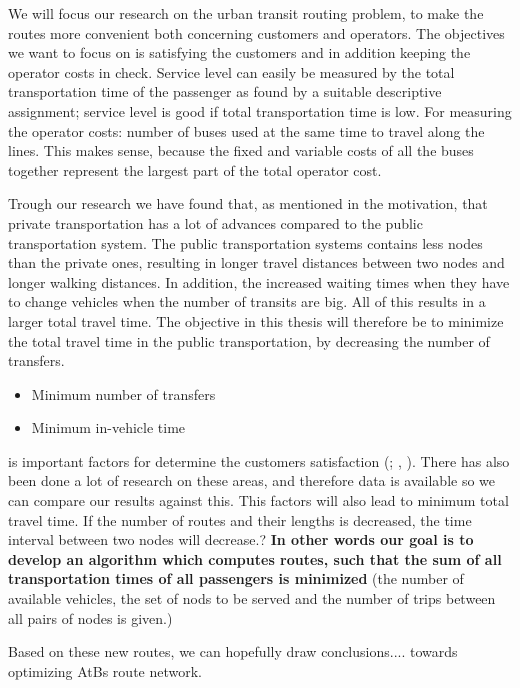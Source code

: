 We will focus our research on the urban transit routing problem, to make the routes more convenient both concerning customers and operators. The objectives we want to focus on is satisfying the customers and in addition keeping the operator costs in check. Service level can easily be measured by the total transportation time of the passenger as found by a suitable descriptive assignment; service level is good if total transportation time is low. For measuring the operator costs: number of buses used at the same time to travel along the lines. This makes sense, because the fixed and variable costs of all the buses together represent the largest part of the total operator cost. %

Trough our research we have found that, as mentioned in the motivation, that private transportation has a lot of advances compared to the public transportation system. The public transportation systems contains less nodes than the private ones, resulting in longer travel distances between two nodes and longer walking distances. In addition, the increased waiting times when they have to change vehicles when the number of transits are big. All of this results in a larger total travel time. The objective in this thesis will therefore be to minimize the total travel time in the public transportation, by decreasing the number of transfers. \citep{mandl79} 
\begin{itemize}
\item Minimum number of transfers
\item Minimum in-vehicle time
\end{itemize}
is important factors for determine the customers satisfaction ({\citet{kechagiopoulos14}; \citet{dias14}, \citet{yang07} }). There has also been done a lot of research on these areas, and therefore data is available so we can compare our results against this. This factors will also lead to minimum total travel time. 
If the number of routes and their lengths is decreased, the time interval between two nodes will decrease.?
\textbf{In other words our goal is to develop an algorithm which computes routes, such that the sum of all transportation times of all passengers is minimized}  (the number of available vehicles, the set of nods to be served and the number of trips between all pairs of nodes is given.) %

\par
Based on these new routes, we can hopefully draw conclusions.... towards optimizing AtBs route network.
